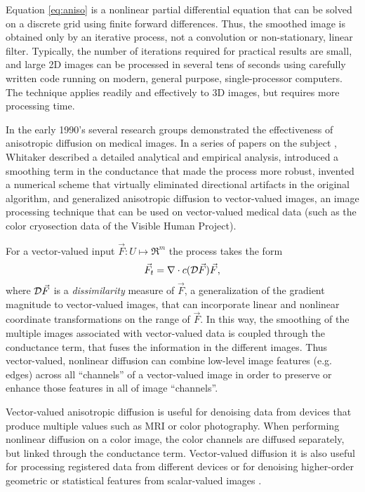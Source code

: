 Equation \ref{eq:aniso} is a nonlinear partial differential equation that can
be solved on a discrete grid using finite forward differences.  Thus, the
smoothed image is obtained only by an iterative process, not a convolution or
non-stationary, linear filter.  Typically, the number of iterations required
for practical results are small, and large 2D images can be processed in
several tens of seconds using carefully written code running on modern, general
purpose, single-processor computers.  The technique applies readily and
effectively to 3D images, but requires more processing time.

In the early 1990's several research groups \cite{Gerig1991,Whitaker1993d}
demonstrated the effectiveness of anisotropic diffusion on medical images.  In
a series of papers on the subject
\cite{Whitaker1993,Whitaker1993b,Whitaker1993c,Whitaker1993d,Whitaker-thesis,Whitaker1994},
Whitaker described a detailed analytical and empirical analysis, introduced a
smoothing term in the conductance that made the process more robust, invented a
numerical scheme that virtually eliminated directional artifacts in the
original algorithm, and generalized anisotropic diffusion to vector-valued
images, an image processing technique that can be used on vector-valued medical
data (such as the color cryosection data of the Visible Human Project).

For a vector-valued input $\vec{F}:U \mapsto \Re^{m}$ the process takes the
form \begin{equation} \vec{F}_{t} = \nabla \cdot c({\cal D}\vec{F}) \vec{F},
\label{eq:vector_diff} \end{equation} where ${\cal D}\vec{F}$ is a {\em
dissimilarity} measure of $\vec{F}$, a generalization of the gradient magnitude
to vector-valued images, that can incorporate linear and nonlinear coordinate
transformations on the range of $\vec{F}$.  In this way, the smoothing of the
multiple images associated with vector-valued data is coupled through the
conductance term, that fuses the information in the different images.  Thus
vector-valued, nonlinear diffusion can combine low-level image features (e.g.
edges) across all ``channels'' of a vector-valued image in order to preserve or
enhance those features in all of image ``channels''.

Vector-valued anisotropic diffusion is useful for denoising data from devices
that produce multiple values such as MRI or color photography.  When performing
nonlinear diffusion on a color image, the color channels are diffused
separately, but linked through the conductance term. Vector-valued diffusion it
is also useful for processing registered data from different devices or for
denoising higher-order geometric or statistical features from scalar-valued
images \cite{Whitaker1994,Yoo1993}.


